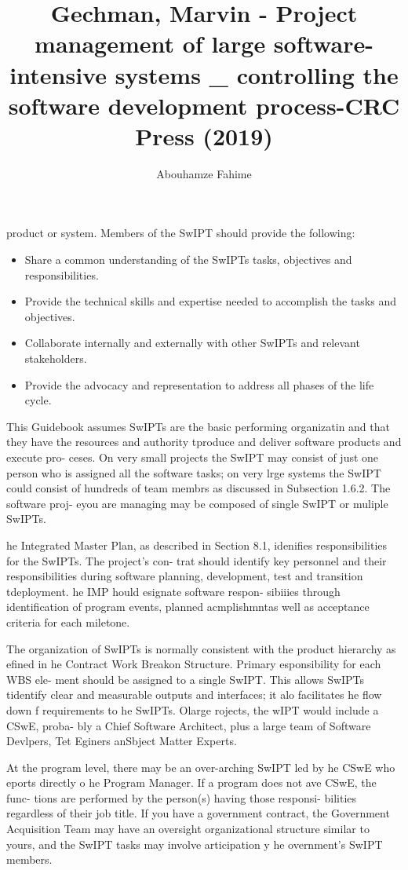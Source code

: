 \documentclass{book}
\title{Gechman, Marvin - Project management of large software-intensive systems _ controlling the software development process-CRC Press (2019)}
\author{Abouhamze Fahime}
\begin{document}
	
\begin{multicols}{2}
product or system. Members of the SwIPT should provide
the following:
\begin{itemize}
\item
Share a common understanding of the SwIPTs tasks,
objectives and responsibilities.
\item
Provide the technical skills and expertise needed to
accomplish the tasks and objectives.
\item
Collaborate internally and externally with other
SwIPTs and relevant stakeholders.
\item
Provide the advocacy and representation to address all
phases of the life cycle.
\end{itemize}

	This Guidebook assumes SwIPTs are the basic performing
organizatin and that they have the resources and authority
tproduce and deliver software products and execute pro-
ceses. On very small projects the SwIPT may consist of just
one person who is assigned all the software tasks; on very
lrge systems the SwIPT could consist of hundreds of team
membrs as discussed in Subsection 1.6.2. The software proj-
eyou are managing may be composed of single SwIPT or
muliple SwIPTs.

	he Integrated Master Plan, as described in Section 8.1,
idenifies responsibilities for the SwIPTs. The project’s con-
trat should identify key personnel and their responsibilities
during software planning, development, test and transition
tdeployment. he IMP hould esignate software respon-
sibiiies through identification of program events, planned
acmplishmntas well as acceptance criteria for each
miletone.

	The organization of SwIPTs is normally consistent with
the product hierarchy as efined in he Contract Work
Breakon Structure. Primary esponsibility for each WBS ele-
ment should be assigned to a single SwIPT. This allows SwIPTs
tidentify clear and measurable outputs and interfaces; it
alo facilitates he flow down f requirements to he SwIPTs.
Olarge rojects, the wIPT would include a CSwE, proba-
bly a Chief Software Architect, plus a large team of Software
Devlpers, Tet Eginers anSbject Matter Experts.

	At the program level, there may be an over-arching
SwIPT led by he CSwE who eports directly o he Program
Manager. If a program does not ave CSwE, the func-
tions are performed by the person(s) having those responsi-
bilities regardless of their job title. If you have a government
contract, the Government Acquisition Team may have an
oversight organizational structure similar to yours, and the
SwIPT tasks may involve articipation y he overnment’s
SwIPT members.\\


\end{multicols}
\end{document}
